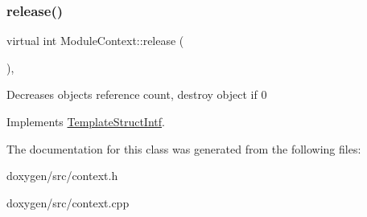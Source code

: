 \subsubsection{\texorpdfstring{release()}{release()}}
{\footnotesize\ttfamily virtual int Module\+Context\+::release (\begin{DoxyParamCaption}{ }\end{DoxyParamCaption})\hspace{0.3cm}{\ttfamily [inline]}, {\ttfamily [virtual]}}

Decreases object\textquotesingle{}s reference count, destroy object if 0 

Implements \mbox{\hyperlink{class_template_struct_intf_a3dce7dd29d3f66a8080b40578e8a5045}{Template\+Struct\+Intf}}.



The documentation for this class was generated from the following files\+:\begin{DoxyCompactItemize}
\item 
doxygen/src/context.\+h\item 
doxygen/src/context.\+cpp\end{DoxyCompactItemize}
